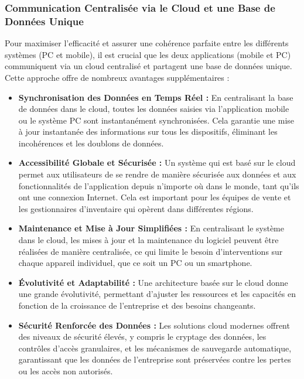 \documentclass[a4paper, oneside, 12pt, final]{extreport}
\begin{document}
\subsubsection{Communication Centralisée via le Cloud et une Base de Données Unique}
Pour maximiser l'efficacité et assurer une cohérence parfaite entre les différents systèmes (PC et mobile), il est crucial que les deux applications (mobile et PC) communiquent via un cloud centralisé et partagent une base de données unique. Cette approche offre de nombreux avantages supplémentaires :
\begin{itemize}
\item \textbf{Synchronisation des Données en Temps Réel :} En centralisant la base de données dans le cloud, toutes les données saisies via l'application mobile ou le système PC sont instantanément synchronisées. Cela garantie une mise à jour instantanée des informations sur tous les dispositifs, éliminant les incohérences et les doublons de données.

\item \textbf{Accessibilité Globale et Sécurisée :} Un système qui est basé sur le cloud permet aux utilisateurs de se rendre de manière sécurisée aux données et aux fonctionnalités de l'application depuis n'importe où dans le monde, tant qu'ils ont une connexion Internet. Cela est important pour les équipes de vente et les gestionnaires d'inventaire qui opèrent dans différentes régions.

\item \textbf{Maintenance et Mise à Jour Simplifiées :} En centralisant le système dans le cloud, les mises à jour et la maintenance du logiciel peuvent être réalisées de manière centralisée, ce qui limite le besoin d'interventions sur chaque appareil individuel, que ce soit un PC ou un smartphone.

\item \textbf{Évolutivité et Adaptabilité :} Une architecture basée sur le cloud donne une grande évolutivité, permettant d'ajuster les ressources et les capacités en fonction de la croissance de l'entreprise et des besoins changeants.

\item \textbf{Sécurité Renforcée des Données :} Les solutions cloud modernes offrent des niveaux de sécurité élevés, y compris le cryptage des données, les contrôles d'accès granulaires, et les mécanismes de sauvegarde automatique, garantissant que les données de l'entreprise sont préservées contre les pertes ou les accès non autorisés.
\end{itemize}
\end{document}
